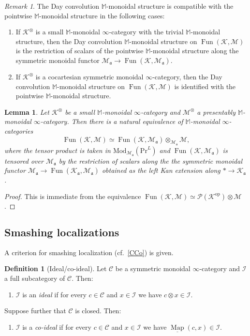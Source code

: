 \documentclass{amsart}
\theoremstyle{plain}
\newtheorem{lemma}[theorem]{Lemma}
\theoremstyle{definition}
\newtheorem{definition}[theorem]{Definition}
\theoremstyle{remark}
\newtheorem{remark}[theorem]{Remark}
\numberwithin{equation}{theorem}
\newcommand{\mcal}[1]{\mathcal{#1}}
\newcommand{\mbb}[1]{\mathbb{#1}}
\newcommand{\mfk}[1]{\mathfrak{#1}}
\newcommand{\Mod}{\mathrm{Mod}}
\renewcommand{\Pr}{\mathrm{Pr}}
\newcommand{\op}{\mathrm{op}}
\newcommand{\Fun}{\operatorname{Fun}}
\newcommand{\Map}{\operatorname{Map}}
\newcommand{\intMap}{\underline{\Map}}
\begin{document}
\begin{remark}
The Day convolution $\mbb{M}$-monoidal structure is compatible with the pointwise $\mbb{M}$-monoidal structure in the following cases:
\begin{enumerate}
\item If $\mcal{K}^\otimes$ is a small $\mbb{M}$-monoidal $\infty$-category with the trivial $\mbb{M}$-monoidal structure, then the Day convolution $\mbb{M}$-monoidal structure on $\Fun(\mcal{K},\mcal{M})$ is the restriction of scalars of the pointwise $\mbb{M}$-monoidal structure along the symmetric monoidal functor $\mcal{M}_\mfk{a}\to\Fun(\mcal{K},\mcal{M}_\mfk{a})$.
\item If $\mcal{K}^\otimes$ is a cocartesian symmetric monoidal $\infty$-category, then the Day convolution $\mbb{M}$-monoidal structure on $\Fun(\mcal{K},\mcal{M})$ is identified with the pointwise $\mbb{M}$-monoidal structure.
\end{enumerate}
\end{remark}

\begin{lemma}\label{lem:Day}
Let $\mcal{K}^\otimes$ be a small $\mbb{M}$-monoidal $\infty$-category and $\mcal{M}^\otimes$ a presentably $\mbb{M}$-monoidal $\infty$-category.
Then there is a natural equivalence of $\mbb{M}$-monoidal $\infty$-categories
\[
	\Fun(\mcal{K},\mcal{M}) \simeq \Fun(\mcal{K},\mcal{M}_\mfk{a})\otimes_{\mcal{M}_\mfk{a}}\mcal{M},
\]
where the tensor product is taken in $\Mod_{\mcal{M}_\mfk{a}}(\Pr^L)$ and $\Fun(\mcal{K},\mcal{M}_\mfk{a})$ is tensored over $\mcal{M}_\mfk{a}$ by the restriction of scalars along the the symmetric monoidal functor $\mcal{M}_\mfk{a}\to\Fun(\mcal{K}_\mfk{a},\mcal{M}_\mfk{a})$ obtained as the left Kan extension along $*\to\mcal{K}_\mfk{a}$.
\end{lemma}
\begin{proof}
This is immediate from the equivalence $\Fun(\mcal{K},\mcal{M})\simeq\mcal{P}(\mcal{K}^\op)\otimes\mcal{M}$.
\end{proof}


\subsection{Smashing localizations}\label{SmL}

A criterion for smashing localization (cf.\ \ref{CCo}) is given.

\begin{definition}[Ideal/co-ideal]\label{def:SmL}
Let $\mcal{C}$ be a symmetric monoidal $\infty$-category and $\mcal{I}$ a full subcategory of $\mcal{C}$.
Then:
\begin{enumerate}
\item $\mcal{I}$ is an \textit{ideal} if for every $c\in\mcal{C}$ and $x\in\mcal{I}$ we have $c\otimes x\in\mcal{I}$.
\end{enumerate}
Suppose further that $\mcal{C}$ is closed.
Then:
\begin{enumerate}[resume]
\item $\mcal{I}$ is a \textit{co-ideal} if for every $c\in\mcal{C}$ and $x\in\mcal{I}$ we have $\intMap(c,x)\in\mcal{I}$.
\end{enumerate}
\end{definition}
\end{document}
